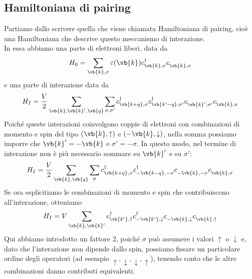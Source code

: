 \subsection{Hamiltoniana di pairing}
Partiamo dallo scrivere quella che viene chiamata Hamiltoniana di pairing, cioè una Hamiltoniana che descrive questo meccanismo di interazione.\\
In essa abbiamo una parte di elettroni liberi, data da
\begin{equation*}
   H_0
   =\sum_{\vb{k},\sigma} \varepsilon(\vb{k}) c^{\dag}_{\vb{k},\sigma} c^{\vphantom{\dag}}_{\vb{k},\sigma}
\end{equation*}
e una parte di interazione data da
\begin{equation*}
   H_I
   =\frac{V}{2} \sum_{\vb{k},\vb{k}',\vb{q}} \sum_{\sigma,\sigma'} 
   c^{\dag}_{\vb{k + q},\sigma} 
   c^{\dag}_{\vb{k' - q},\sigma'} 
   c^{\vphantom{\dag}}_{\vb{k}',\sigma'} 
   c^{\vphantom{\dag}}_{\vb{k},\sigma}
\end{equation*}
Poiché queste interazioni coinvolgono coppie di elettroni con combinazioni di momento e spin del tipo $(\vb{k},\uparrow)$ e $(-\vb{k},\downarrow)$, nella somma possiamo imporre che $\vb{k}'=-\vb{k}$ e $\sigma'=-\sigma$. In questo modo, nel termine di interazione non è più necessario sommare su $\vb{k}'$ e su $\sigma'$:
\begin{equation*}
   H_I
   =\frac{V}{2} \sum_{\vb{k},\vb{q}} \sum_{\sigma} 
   c^{\dag}_{\vb{k + q},\sigma} 
   c^{\dag}_{-\vb{k - q},-\sigma} 
   c^{\vphantom{\dag}}_{-\vb{k},-\sigma} 
   c^{\vphantom{\dag}}_{\vb{k},\sigma}
\end{equation*}
Se ora esplicitiamo le combinazioni di momento e spin che contribuiscono all'interazione, otteniamo
\begin{equation*}
   H_I
   = V \sum_{\vb{k},\vb{k}'} 
   c^{\dag}_{\vb{k'},\uparrow} 
   c^{\dag}_{-\vb{k'},\downarrow} 
   c^{\vphantom{\dag}}_{-\vb{k},\downarrow} 
   c^{\vphantom{\dag}}_{\vb{k},\uparrow}
\end{equation*}
Qui abbiamo introdotto un fattore 2, poiché $\sigma$ può assumere i valori $\uparrow$ o $\downarrow$ e, dato che l'interazione non dipende dallo spin, possiamo fissare un particolare ordine degli operatori (ad esempio $\uparrow, \downarrow, \downarrow, \uparrow$), tenendo conto che le altre combinazioni danno contributi equivalenti.\\
